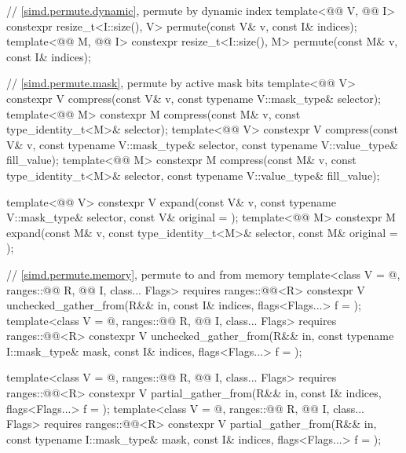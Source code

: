 \begin{codeblock}
{  // \ref{simd.permute.dynamic}, permute by dynamic index
  template<@@ V, @@ I>
    constexpr resize_t<I::size(), V> permute(const V& v, const I& indices);
  template<@@ M, @@ I>
    constexpr resize_t<I::size(), M> permute(const M& v, const I& indices);

  // \ref{simd.permute.mask}, permute by active mask bits
  template<@@ V>
    constexpr V compress(const V& v, const typename V::mask_type& selector);
  template<@@ M>
    constexpr M compress(const M& v, const type_identity_t<M>& selector);
  template<@@ V>
    constexpr V compress(const V& v, const typename V::mask_type& selector,
                         const typename V::value_type& fill_value);
  template<@@ M>
    constexpr M compress(const M& v, const type_identity_t<M>& selector,
                         const typename V::value_type& fill_value);

  template<@@ V>
    constexpr V expand(const V& v, const typename V::mask_type& selector,
                       const V& original = {});
  template<@@ M>
    constexpr M expand(const M& v, const type_identity_t<M>& selector,
                       const M& original = {});

  // \ref{simd.permute.memory}, permute to and from memory
  template<class V = @\seebelow@,
           ranges::@@ R, @@ I, class... Flags>
    requires ranges::@@<R>
    constexpr V
      unchecked_gather_from(R&& in,
                            const I& indices, flags<Flags...> f = {});
  template<class V = @\seebelow@,
           ranges::@@ R, @@ I, class... Flags>
    requires ranges::@@<R>
    constexpr V
      unchecked_gather_from(R&& in, const typename I::mask_type& mask,
                            const I& indices, flags<Flags...> f = {});

  template<class V = @\seebelow@,
     ranges::@@ R, @@ I, class... Flags>
    requires ranges::@@<R>
    constexpr V
      partial_gather_from(R&& in,
                          const I& indices, flags<Flags...> f = {});
  template<class V = @\seebelow@,
             ranges::@@ R, @@ I, class... Flags>
    requires ranges::@@<R>
    constexpr V
      partial_gather_from(R&& in, const typename I::mask_type& mask,
                          const I& indices, flags<Flags...> f = {});

}
\end{codeblock}
